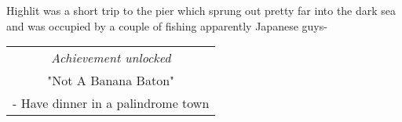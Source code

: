 Highlit was a short trip to the pier which sprung out pretty far into the dark sea and was occupied by a couple of fishing apparently Japanese guys-

\begin{center}
\begin{tabular}{||c||}
\emph{Achievement unlocked}\\
"Not A Banana Baton"\\
\multicolumn{1}{||p{0.8\textwidth}||}{\footnotesize - Have dinner in a palindrome town} \\
\end{tabular}
\end{center}





